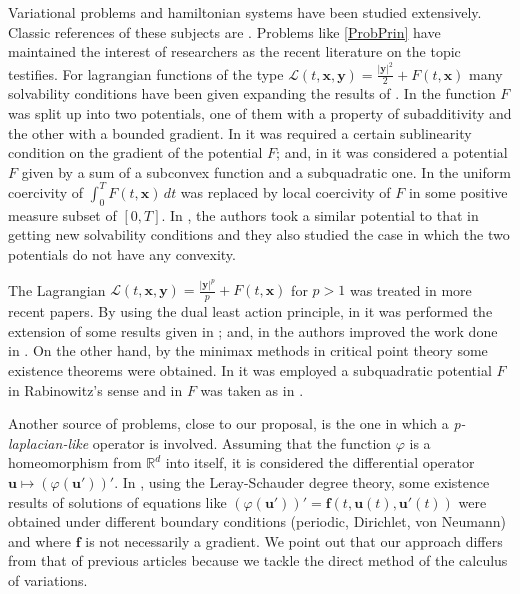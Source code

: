\documentclass[twoside]{elsarticle}
\theoremstyle{remark}
\renewcommand{\b}[1]{\boldsymbol{#1}}
\newcommand{\rr}{\mathbb{R}}
\begin{document}
Variational problems and hamiltonian systems  have been studied extensively. Classic references of these subjects are
\cite{mawhin2010critical,struwe2008variational,ekeland1999convex}. Problems like \eqref{ProbPrin} have maintained the interest of researchers as the recent literature on the topic testifies. 
For lagrangian functions of the type $\mathcal{L}(t,\b{x},\b{y})=\frac{|\b{y}|^2}{2}+F(t,\b{x})$  many solvability conditions have been given expanding the results of \cite{mawhin2010critical}.  
In  \cite{tang1995periodic} the function $F$ was split up into two potentials, one of them with a property of subadditivity and the other with a bounded gradient.
In \cite{tang1998periodic} it was required a certain sublinearity condition on the gradient of the potential $F$; and, 
in \cite{wu1999periodic} it was considered a potential $F$ given by a sum of a subconvex function and a  subquadratic one. 
In  \cite{tang2001periodic} the uniform coercivity of $\int_0^T F(t,\b{x})\,dt$
was replaced by local coercivity of $F$ in some positive measure subset of $[0,T]$.
In \cite{zhao2004periodic}, the authors took a similar potential to that in \cite{wu1999periodic} getting new solvability conditions 
and they also studied the case in which the two potentials do not have any convexity.


The Lagrangian  $\mathcal{L}(t,\b{x},\b{y})=\frac{|\b{y}|^p}{p}+F(t,\b{x})$
for $p>1$ was treated in more recent papers.
By using the dual least action principle, in \cite{Tian2007192}
it was performed the extension of some results given in \cite{mawhin2010critical};
and, in \cite{tang2010periodic} the authors improved the work done in \cite{wu1999periodic}.
On the other hand, by the minimax methods in critical point theory 
some existence theorems were obtained.
In \cite{xu2007some} it was employed a subquadratic potential $F$ in Rabinowitz{}'s sense and in \cite{ye2008periodic} $F$ was taken as in \cite{tang1998periodic}.

Another source of problems, close to our proposal, is the one in which a \emph {p-laplacian-like} operator is involved.
Assuming that the function $\varphi$ is a homeomorphism  from $\rr^d$ into itself, it is considered the differential operator
$\b u \mapsto (\varphi(\b u'))'$. 
In  \cite{C-2007,C-2009, 
Cristia-2008, manasevich2000boundary, manasevich1998periodic}, using 
the Leray-Schauder degree theory,
some existence results of solutions of equations 
like 
$(\varphi({\b u}'))'={\b f}(t,{\b u}(t),{\b u}'(t))$ were obtained 
under different boundary conditions (periodic, Dirichlet, von Neumann) 
and where $\b f$ is not necessarily a gradient. 
We point out that our approach 
differs from that of previous articles because
we tackle the direct method of the calculus of variations.
\end{document}
